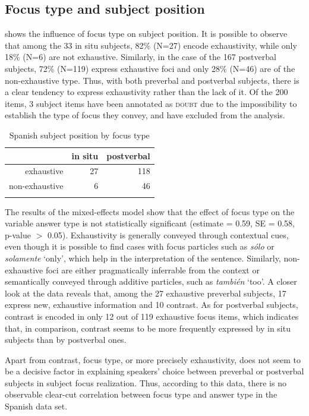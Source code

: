 \subsection{Focus type and subject position} \label{sub:6.6.1}
 shows the influence of focus type on subject position. It is possible to observe that among the 33 in situ subjects, 82\% (N=27) encode exhaustivity, while only 18\% (N=6) are not exhaustive. Similarly, in the case of the 167 postverbal subjects, 72\% (N=119) express exhaustive foci and only 28\% (N=46) are of the non-exhaustive type. Thus, with both preverbal and postverbal subjects, there is a clear tendency to express exhaustivity rather than the lack of it. Of the 200 items, 3 subject items have been annotated as \textsc{doubt} due to the impossibility to establish the type of focus they convey, and have excluded from the analysis.

\begin{table}[ht]
\begin{tabular}{rrr}
  \lsptoprule
 & in situ & postverbal \\ 
  \midrule
exhaustive &  27 & 118 \\ 
  non-exhaustive &   6 &  46 \\ 
   \lspbottomrule
\end{tabular}
     \caption{Spanish subject position by focus type}
     \label{tab:6.2}
\end{table}


The results of the mixed-effects model show that the effect of focus type on the variable answer type is not statistically significant (estimate = 0.59, SE = 0.58, p-value $>$ 0.05). 
Exhaustivity is generally conveyed through contextual cues, even though it is possible to find cases with focus particles such as \textit{sólo} or \textit{solamente} `only', which help in the interpretation of the sentence. Similarly, non-exhaustive foci are either pragmatically inferrable from the context or semantically conveyed through additive particles, such as \textit{también} `too'. A closer look at the data reveals that, among the 27 exhaustive preverbal subjects, 17 express new, exhaustive information and 10 contrast. As for postverbal subjects, contrast is encoded in only 12 out of 119 exhaustive focus items, which indicates that, in comparison, contrast seems to be more frequently expressed by in situ subjects than by postverbal ones.

Apart from contrast, focus type, or more precisely exhaustivity, does not seem to be a decisive factor in explaining speakers' choice between preverbal or postverbal subjects in subject focus realization. Thus, according to this data, there is no observable clear-cut correlation between focus type and answer type in the Spanish data set. 

